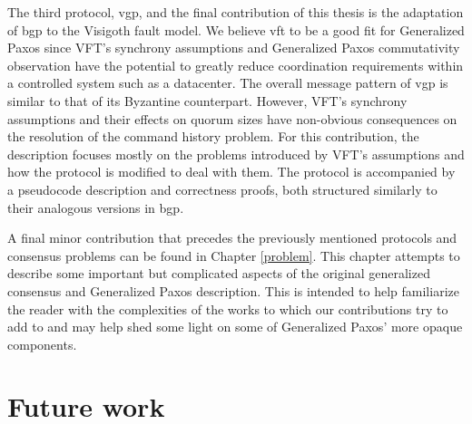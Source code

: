The third protocol, \acrlong{vgp}, and the final contribution of this thesis is the adaptation of \acrshort{bgp} to the Visigoth fault model. We believe \acrshort{vft} to be a good fit for Generalized Paxos since VFT's synchrony assumptions and Generalized Paxos commutativity observation have the potential to greatly reduce coordination requirements within a controlled system such as a datacenter. The overall message pattern of \acrshort{vgp} is similar to that of its Byzantine counterpart. However, VFT's synchrony assumptions and their effects on quorum sizes have non-obvious consequences on the resolution of the command history problem. For this contribution, the description focuses mostly on the problems introduced by VFT's assumptions and how the protocol is modified to deal with them. The protocol is accompanied by a pseudocode description and correctness proofs, both structured similarly to their analogous versions in \acrshort{bgp}. \par
A final minor contribution that precedes the previously mentioned protocols and consensus problems can be found in Chapter \ref{problem}. This chapter attempts to describe some important but complicated aspects of the original generalized consensus and Generalized Paxos description. This is intended to help familiarize the reader with the complexities of the works to which our contributions try to add to and may help shed some light on some of Generalized Paxos' more opaque components.

\section{Future work}

